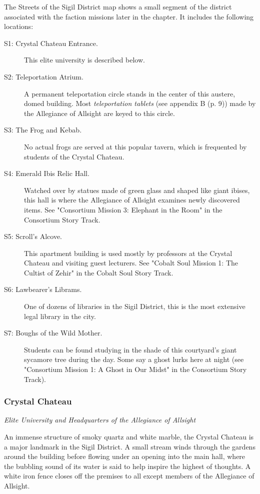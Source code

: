 \documentclass[a4paper, 11pt, bg=full, twocolumn, nooutline]{dndbook}
\begin{document}
The Streets of the Sigil District map shows a small segment of the district associated with the faction missions later in the chapter. It includes the following locations:

\begin{description}
\item[S1: Crystal Chateau Entrance.] This elite university is described below.
\item[S2: Teleportation Atrium.] A permanent teleportation circle stands in the center of this austere, domed building. Most \textit{teleportation tablets} (see appendix B (p. 9)) made by the Allegiance of Allsight are keyed to this circle.
\item[S3: The Frog and Kebab.] No actual frogs are served at this popular tavern, which is frequented by students of the Crystal Chateau.
\item[S4: Emerald Ibis Relic Hall.] Watched over by statues made of green glass and shaped like giant ibises, this hall is where the Allegiance of Allsight examines newly discovered items. See "Consortium Mission 3: Elephant in the Room" in the Consortium Story Track.
\item[S5: Scroll's Alcove.] This apartment building is used mostly by professors at the Crystal Chateau and visiting guest lecturers. See "Cobalt Soul Mission 1: The Cultist of Zehir" in the Cobalt Soul Story Track.
\item[S6: Lawbearer's Librams.] One of dozens of libraries in the Sigil District, this is the most extensive legal library in the city.
\item[S7: Boughs of the Wild Mother.] Students can be found studying in the shade of this courtyard's giant sycamore tree during the day. Some say a ghost lurks here at night (see "Consortium Mission 1: A Ghost in Our Midst" in the Consortium Story Track).
\end{description}



\subsubsection{Crystal Chateau}

\textit{Elite University and Headquarters of the Allegiance of Allsight}

An immense structure of smoky quartz and white marble, the Crystal Chateau is a major landmark in the Sigil District. A small stream winds through the gardens around the building before flowing under an opening into the main hall, where the bubbling sound of its water is said to help inspire the highest of thoughts. A white iron fence closes off the premises to all except members of the Allegiance of Allsight.
\end{document}
